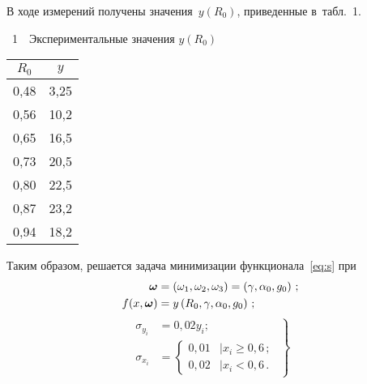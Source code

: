 \begin{multicols}{2}
В ходе измерений получены значения~$y(R_0)$, приведенные в~табл.~1.

\vspace*{6pt}

 {\small \begin{center}  %
 \noindent
\parbox{32mm}{{{\tablename~1}\ \ \small{Экспериментальные значения $y(R_0)$}}
}

\vspace*{2ex}


    \tabcolsep=12pt
    \begin{tabular}{|c|c|}
    \hline
    $R_0$   &   $y$\\
    \hline
    0,48 & \hphantom{9,}3,25\\
    0,56  &10,2\\
    0,65  &16,5\\
    0,73  &20,5\\
    0,80  &22,5\\
    0,87 &23,2\\
    0,94 &18,2 \\ 
    \hline
  \end{tabular}
  \end{center}
  }


\vspace*{6pt}

\addtocounter{table}{1}

Таким образом, решается задача минимизации функционала~\eqref{eq:s} при
\begin{align*}
  \boldsymbol{\omega} &= \left(\omega_1, \omega_2, \omega_3\right) = \left(\gamma, \alpha_0, g_0\right)\,;
\\
  f(x, \boldsymbol{\omega}) &= y\left(R_0, \gamma, \alpha_0, g_0\right)\,;
\end{align*}
\begin{equation}
\left.
  \begin{array}{rl}
    \sigma_{y_i} &= 0{,}02 y_i;\\
    \sigma_{x_i} &= \begin{cases}
        0{,}01 & \mid x_i \geq 0{,}6\,; \\
        0{,}02 & \mid x_i < 0{,}6\,.
        \end{cases}
      \end{array}
    \right\}
  \label{eq:sigmas_definition}
\end{equation}


\end{multicols}

